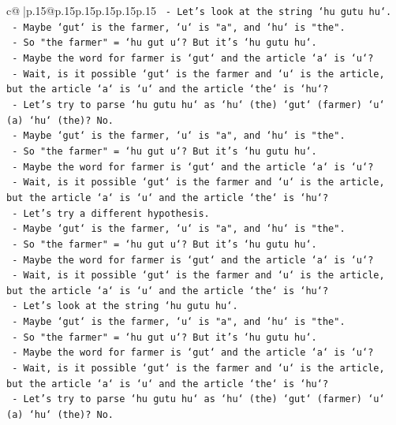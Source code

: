 \documentclass{article}
\begin{document}
{\begin{supertabular}{c@{$\;$}|p{.15\linewidth}@{}p{.15\linewidth}p{.15\linewidth}p{.15\linewidth}p{.15\linewidth}p{.15\linewidth}}
{{{\texttt{   {-} Let's look at the string `hu gutu hu`.} \\
\texttt{   {-} Maybe `gut` is the farmer, `u` is "a", and `hu` is "the".} \\
\texttt{   {-} So "the farmer" = `hu gut u`? But it's `hu gutu hu`.} \\
\texttt{   {-} Maybe the word for farmer is `gut` and the article `a` is `u`?} \\
\texttt{   {-} Wait, is it possible `gut` is the farmer and `u` is the article, but the article `a` is `u` and the article `the` is `hu`?} \\
\texttt{   {-} Let's try to parse `hu gutu hu` as `hu` (the) `gut` (farmer) `u` (a) `hu` (the)? No.} \\
\texttt{   {-} Maybe `gut` is the farmer, `u` is "a", and `hu` is "the".} \\
\texttt{   {-} So "the farmer" = `hu gut u`? But it's `hu gutu hu`.} \\
\texttt{   {-} Maybe the word for farmer is `gut` and the article `a` is `u`?} \\
\texttt{   {-} Wait, is it possible `gut` is the farmer and `u` is the article, but the article `a` is `u` and the article `the` is `hu`?} \\
\texttt{   {-} Let's try a different hypothesis.} \\
\texttt{   {-} Maybe `gut` is the farmer, `u` is "a", and `hu` is "the".} \\
\texttt{   {-} So "the farmer" = `hu gut u`? But it's `hu gutu hu`.} \\
\texttt{   {-} Maybe the word for farmer is `gut` and the article `a` is `u`?} \\
\texttt{   {-} Wait, is it possible `gut` is the farmer and `u` is the article, but the article `a` is `u` and the article `the` is `hu`?} \\
\texttt{   {-} Let's look at the string `hu gutu hu`.} \\
\texttt{   {-} Maybe `gut` is the farmer, `u` is "a", and `hu` is "the".} \\
\texttt{   {-} So "the farmer" = `hu gut u`? But it's `hu gutu hu`.} \\
\texttt{   {-} Maybe the word for farmer is `gut` and the article `a` is `u`?} \\
\texttt{   {-} Wait, is it possible `gut` is the farmer and `u` is the article, but the article `a` is `u` and the article `the` is `hu`?} \\
\texttt{   {-} Let's try to parse `hu gutu hu` as `hu` (the) `gut` (farmer) `u` (a) `hu` (the)? No.} \\
}}}
\end{supertabular}}
\end{document}

